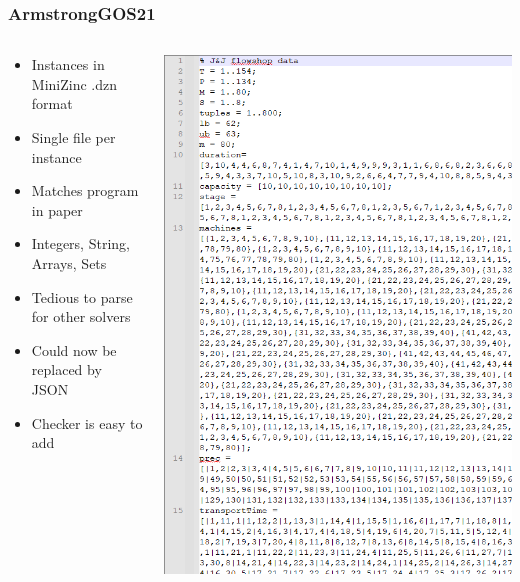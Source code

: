 \documentclass[dvipsnames,aspectratio=169]{beamer}
\begin{document}
\begin{frame}
\frametitle{ArmstrongGOS21~\cite{ArmstrongGOS21}}
\begin{columns}
\begin{column}{0.5\textwidth}
\begin{itemize}
\item Instances in MiniZinc .dzn format
\item Single file per instance
\item Matches program in paper
\item Integers, String, Arrays, Sets
\item Tedious to parse for other solvers
\item Could now be replaced by JSON
\item Checker is easy to add
\end{itemize}
\end{column}
\begin{column}{0.5\textwidth}
\includegraphics[width=.7\textwidth]{images/ArmstrongGOS21}
\end{column}
\end{columns}
\end{frame}
\end{document}
